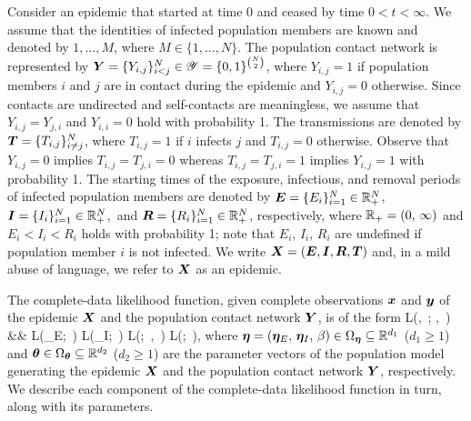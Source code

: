 \documentclass[12pt,usenatbib,referee]{article}
\begin{document}
Consider an epidemic that started at time $0$ and ceased by time $0 < t < \infty$.
We assume that the identities of infected population members are known and denoted by $1, \dots, M$,
where $M \in \{1, \dots, N\}$.
The population contact network is represented by $\bm{Y} = \{Y_{i,j}\}_{i < j}^N \in \mathscr{Y} = \{0, 1\}^{\binom{N}{2}}$,
where $Y_{i,j} = 1$ if population members $i$ and $j$ are in contact during the epidemic and $Y_{i,j} = 0$ otherwise.
Since contacts are undirected and self-contacts are meaningless,
we assume that $Y_{i,j} = Y_{j,i}$ and $Y_{i,i} = 0$ hold with probability 1.
The transmissions are denoted by $\bm{T} = \{T_{i,j}\}_{i \neq j}^N$,
where $T_{i,j} = 1$ if $i$ infects $j$ and $T_{i,j} = 0$ otherwise.
Observe that $Y_{i,j} = 0$ implies $T_{i,j} = T_{j,i} = 0$ whereas $T_{i,j} = T_{j,i} = 1$ implies $Y_{i,j} = 1$ with probability 1.
The starting times of the exposure, infectious, and removal periods of infected population members are denoted by
$\bm{E} = \{E_i\}_{i=1}^N \in \mathbb{R}_+^N$,\,
$\bm{I} = \{I_i\}_{i=1}^N \in \mathbb{R}_+^N$,\,
and $\bm{R} = \{R_i\}_{i=1}^N \in \mathbb{R}_+^N$,
respectively,
where $\mathbb{R}_+ = (0,\, \infty)$ and $E_i < I_i < R_i$ holds with probability 1;
note that $E_i,\, I_i,\, R_i$ are undefined if population member $i$ is not infected.
We write $\bm{X} = (\bm{E}, \bm{I}, \bm{R}, \bm{T})$ and, 
in a mild abuse of language,
we refer to $\bm{X}$ as an epidemic. 

The complete-data likelihood function, 
given complete observations $\bm{x}$ and $\bm{y}$ of the epidemic $\bm{X}$ and the population contact network $\bm{Y}$,
is of the form
\bea
\label{eq:likelihood}
L(\bta,\, \btheta;\; \bx,\, \by) 
&\propto& L(\bta_E;\, \bx)\; L(\bta_I;\, \bx)\; L(\beta;\, \bx,\, \by)\; L(\btheta;\, \by),
\eea
where $\boldsymbol{\eta} = (\boldsymbol{\eta}_E,\, \boldsymbol{\eta}_I,\, \beta) \in \Omega_{\boldsymbol{\eta}} \subseteq \mathbb{R}^{d_1}$ ($d_1 \geq 1$) and $\boldsymbol{\theta} \in \Omega_{\boldsymbol{\theta}} \subseteq \mathbb{R}^{d_2}$ ($d_2 \geq 1$) are the parameter vectors of the population model generating the epidemic $\bm{X}$ and the population contact network $\bm{Y}$,
respectively.
We describe each component of the complete-data likelihood function in turn,
along with its parameters.
\end{document}
